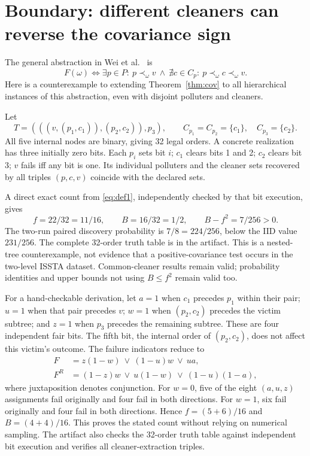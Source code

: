\documentclass[11pt,a4paper]{article}
\theoremstyle{definition}\newtheorem{definition}[theorem]{Definition}
\theoremstyle{remark}\newtheorem{remark}[theorem]{Remark}
\theoremstyle{definition}\newtheorem{xexample}[xtheorem]{Example}\theoremstyle{plain}
\begin{document}
\section{Boundary: different cleaners can reverse the covariance sign}\label{sec:boundary}
The general abstraction in Wei et al.~\cite{wei} is
\begin{equation}\label{eq:def1}
 F(\omega)\iff \exists p\in P:\ p\prec_\omega v\ \land\
 \nexists c\in C_p:\ p\prec_\omega c\prec_\omega v.
\end{equation}
Here is a counterexample to extending Theorem~\ref{thm:cov} to all hierarchical instances of this abstraction, even with disjoint polluters and cleaners.

Let
\[
 T=(((v,(p_1,c_1)),(p_2,c_2)),p_3),\qquad
 C_{p_1}=C_{p_2}=\{c_1\},\quad C_{p_3}=\{c_2\}.
\]
All five internal nodes are binary, giving 32 legal orders. A concrete realization has three initially zero bits. Each $p_i$ sets bit $i$; $c_1$ clears bits 1 and 2; $c_2$ clears bit 3; $v$ fails iff any bit is one. Its individual polluters and the cleaner sets recovered by all triples $(p,c,v)$ coincide with the declared sets.

A direct exact count from \eqref{eq:def1}, independently checked by that bit execution, gives
\[
 f=22/32=11/16,\qquad B=16/32=1/2,
 \qquad B-f^2=7/256>0.
\]
The two-run paired discovery probability is $7/8=224/256$, below the IID value $231/256$. The complete 32-order truth table is in the artifact. This is a nested-tree counterexample, not evidence that a positive-covariance test occurs in the two-level ISSTA dataset. Common-cleaner results remain valid; probability identities and upper bounds not using $B\le f^2$ remain valid too.

For a hand-checkable derivation, let $a=1$ when $c_1$ precedes $p_1$ within their pair; $u=1$ when that pair precedes $v$; $w=1$ when $(p_2,c_2)$ precedes the victim subtree; and $z=1$ when $p_3$ precedes the remaining subtree. These are four independent fair bits. The fifth bit, the internal order of $(p_2,c_2)$, does not affect this victim's outcome. The failure indicators reduce to
\begin{align*}
 F&=z(1-w)\ \lor\ (1-u)w\ \lor\ ua,\\
 F^R&=(1-z)w\ \lor\ u(1-w)\ \lor\ (1-u)(1-a),
\end{align*}
where juxtaposition denotes conjunction. For $w=0$, five of the eight $(a,u,z)$ assignments fail originally and four fail in both directions. For $w=1$, six fail originally and four fail in both directions. Hence $f=(5+6)/16$ and $B=(4+4)/16$. This proves the stated count without relying on numerical sampling. The artifact also checks the 32-order truth table against independent bit execution and verifies all cleaner-extraction triples.
\end{document}
